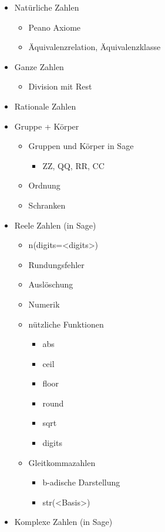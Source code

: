 \documentclass[a4paper,9pt,DIV15,twocolumn]{scrartcl}
\begin{document}
\begin{itemize}
 \item Natürliche Zahlen
\begin{itemize}
 \item Peano Axiome
 \item Äquivalenzrelation, Äquivalenzklasse
\end{itemize}
 \item Ganze Zahlen
\begin{itemize} 
\item Division mit Rest
\end{itemize}
\item Rationale Zahlen
\item Gruppe + Körper
\begin{itemize}
\item Gruppen und Körper in Sage
\begin{itemize}
\item ZZ, QQ, RR, CC
\end{itemize}
\item Ordnung
\item Schranken
\end{itemize}
\item Reele Zahlen (in Sage)
\begin{itemize}
\item n(digits=<digits>)
\item Rundungsfehler
\item Auslöschung
\item Numerik
\item nützliche Funktionen
\begin{itemize}
\item abs
\item ceil
\item floor
\item round
\item sqrt
\item digits
\end{itemize}
\item Gleitkommazahlen
\begin{itemize}
\item b-adische Darstellung
\item str(<Basis>)
\end{itemize}
\end{itemize}
\item Komplexe Zahlen (in Sage)
 \end{itemize}
\end{document}
